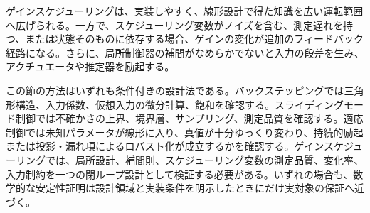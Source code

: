 ゲインスケジューリングは、実装しやすく、線形設計で得た知識を広い運転範囲へ広げられる。一方で、スケジューリング変数がノイズを含む、測定遅れを持つ、または状態そのものに依存する場合、ゲインの変化が追加のフィードバック経路になる。さらに、局所制御器の補間がなめらかでないと入力の段差を生み、アクチュエータや推定器を励起する。

この節の方法はいずれも条件付きの設計法である。バックステッピングでは三角形構造、入力係数、仮想入力の微分計算、飽和を確認する。スライディングモード制御では不確かさの上界、境界層、サンプリング、測定品質を確認する。適応制御では未知パラメータが線形に入り、真値が十分ゆっくり変わり、持続的励起または投影・漏れ項によるロバスト化が成立するかを確認する。ゲインスケジューリングでは、局所設計、補間則、スケジューリング変数の測定品質、変化率、入力制約を一つの閉ループ設計として検証する必要がある。いずれの場合も、数学的な安定性証明は設計領域と実装条件を明示したときにだけ実対象の保証へ近づく。
